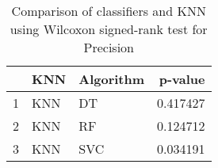 \begin{table}
\footnotesize
\caption{Comparison of classifiers and KNN using Wilcoxon signed-rank test for Precision}
\label{tab:KNN wilcoxon Precision comparison}
\begin{tabular}{lllr}
\hline
 & KNN & Algorithm & p-value \\
\hline
1 & KNN & DT & 0.417427 \\
2 & KNN & RF & 0.124712 \\
3 & KNN & SVC & 0.034191 \\
\hline
\end{tabular}
\end{table}
